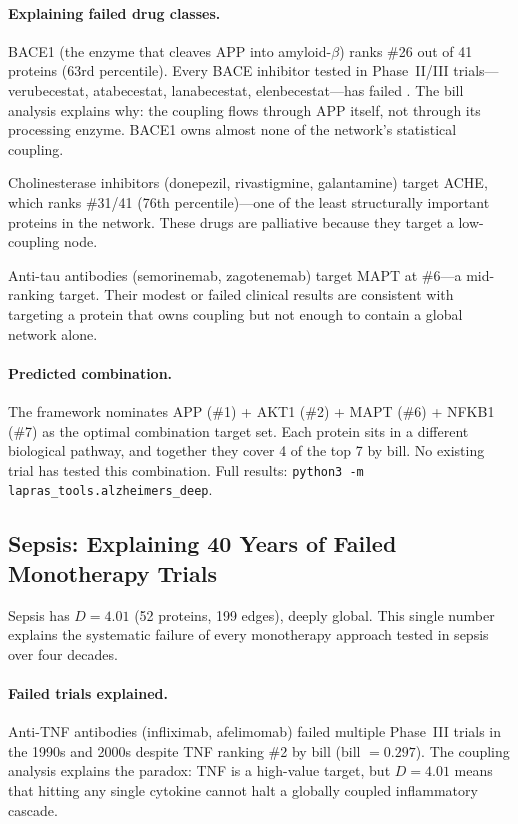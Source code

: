 \documentclass[11pt,a4paper]{article}
\begin{document}
\paragraph{Explaining failed drug classes.} BACE1 (the enzyme that cleaves APP into amyloid-$\beta$) ranks \#26 out of 41 proteins (63rd percentile). Every BACE inhibitor tested in Phase~II/III trials---verubecestat, atabecestat, lanabecestat, elenbecestat---has failed \citep{egan2018}. The bill analysis explains why: the coupling flows through APP itself, not through its processing enzyme. BACE1 owns almost none of the network's statistical coupling.

Cholinesterase inhibitors (donepezil, rivastigmine, galantamine) target ACHE, which ranks \#31/41 (76th percentile)---one of the least structurally important proteins in the network. These drugs are palliative because they target a low-coupling node.

Anti-tau antibodies (semorinemab, zagotenemab) target MAPT at \#6---a mid-ranking target. Their modest or failed clinical results are consistent with targeting a protein that owns coupling but not enough to contain a global network alone.

\paragraph{Predicted combination.} The framework nominates APP (\#1) + AKT1 (\#2) + MAPT (\#6) + NFKB1 (\#7) as the optimal combination target set. Each protein sits in a different biological pathway, and together they cover 4 of the top 7 by bill. No existing trial has tested this combination. Full results: \texttt{python3 -m lapras\_tools.alzheimers\_deep}.

\subsection{Sepsis: Explaining 40 Years of Failed Monotherapy Trials}
\label{sec:sepsis}

Sepsis has $D = 4.01$ (52 proteins, 199 edges), deeply global. This single number explains the systematic failure of every monotherapy approach tested in sepsis over four decades.

\paragraph{Failed trials explained.} Anti-TNF antibodies (infliximab, afelimomab) failed multiple Phase~III trials in the 1990s and 2000s despite TNF ranking \#2 by bill (bill $= 0.297$). The coupling analysis explains the paradox: TNF is a high-value target, but $D = 4.01$ means that hitting any single cytokine cannot halt a globally coupled inflammatory cascade.
\end{document}
